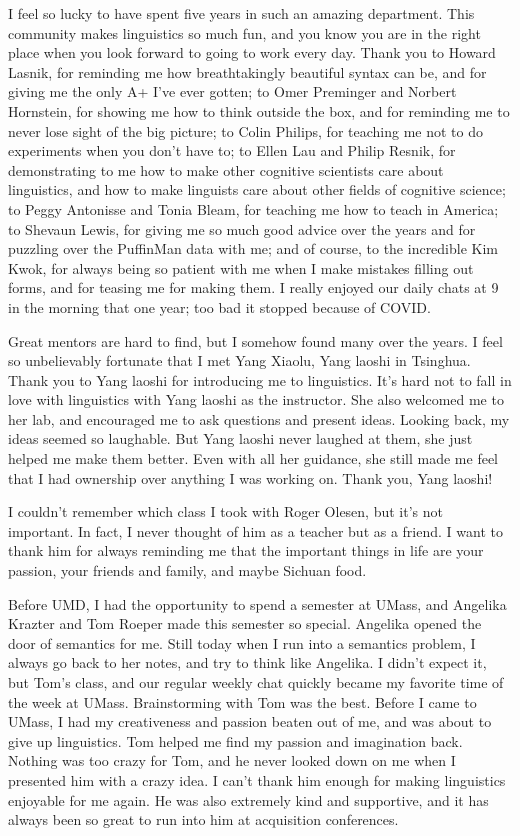 I feel so lucky to have spent five years in such an amazing department. This community makes linguistics so much fun, and you know you are in the right place when you look forward to going to work every day. Thank you to Howard Lasnik, for reminding me how breathtakingly beautiful syntax can be, and for giving me the only A+ I’ve ever gotten; to Omer Preminger and Norbert Hornstein, for showing me how to think outside the box, and for reminding me to never lose sight of the big picture; to Colin Philips, for teaching me not to do experiments when you don’t have to; to Ellen Lau and Philip Resnik, for demonstrating to me how to make other cognitive scientists care about linguistics, and how to make linguists care about other fields of cognitive science; to Peggy Antonisse and Tonia Bleam, for teaching me how to teach in America; to Shevaun Lewis, for giving me so much good advice over the years and for puzzling over the PuffinMan data with me; and of course, to the incredible Kim Kwok, for always being so patient with me when I make mistakes filling out forms, and for teasing me for making them. I really enjoyed our daily chats at 9 in the morning that one year; too bad it stopped because of COVID.
 
Great mentors are hard to find, but I somehow found many over the years. I feel so unbelievably fortunate that I met Yang Xiaolu, Yang laoshi in Tsinghua. Thank you to Yang laoshi for introducing me to linguistics. It's hard not to fall in love with linguistics with Yang laoshi as the instructor. She also welcomed me to her lab, and encouraged me to ask questions and present ideas. Looking back, my ideas seemed so laughable. But Yang laoshi never laughed at them, she just helped me make them better. Even with all her guidance, she still made me feel that I had ownership over anything I was working on. Thank you, Yang laoshi!  

I couldn’t remember which class I took with Roger Olesen, but it’s not important. In fact, I never thought of him as a teacher but as a friend. I want to thank him for always reminding me that the important things in life are your passion, your friends and family, and maybe Sichuan food.
 
Before UMD, I had the opportunity to spend a semester at UMass, and Angelika Krazter and Tom Roeper made this semester so special. Angelika opened the door of semantics for me. Still today when I run into a semantics problem, I always go back to her notes, and try to think like Angelika. I didn’t expect it, but Tom’s class, and our regular weekly chat quickly became my favorite time of the week at UMass. Brainstorming with Tom was the best. Before I came to UMass, I had my creativeness and passion beaten out of me, and was about to give up linguistics. Tom helped me find my passion and imagination back. Nothing was too crazy for Tom, and he never looked down on me when I presented him with a crazy idea. I can’t thank him enough for making linguistics enjoyable for me again. He was also extremely kind and supportive, and it has always been so great to run into him at acquisition conferences.
 
